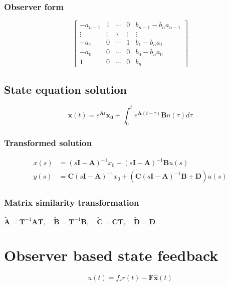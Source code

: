 \subsubsection*{Observer form}
\[
\left[\begin{array}{cccc|c}
-a_{n-1} & 1 & \cdots & 0 & b_{n-1}-b_{n}a_{n-1}\\
\vdots & \vdots & \ddots & \vdots & \vdots\\
-a_{1} & 0 & \cdots & 1 & b_{1}-b_{n}a_{1}\\
-a_{0} & 0 & \cdots & 0 & b_{0}-b_{n}a_{0}\\
\hline 1 & 0 & \cdots & 0 & b_{n}
\end{array}\right]
\]

\subsection*{State equation solution}
\[ \boldsymbol{x}(t) = e^{\boldsymbol{A}t}\boldsymbol{x_0} + \int_{0}^{t} e^{\boldsymbol{A}(t-\tau)}\boldsymbol{B}u(\tau)d\tau \]

\subsubsection*{Transformed solution}

\begin{align*}
x(s) & = (s\boldsymbol{I} - \boldsymbol{A})^{-1}x_0 + (s\boldsymbol{I} - \boldsymbol{A})^{-1}\boldsymbol{B}u(s)\\
y(s) & = \boldsymbol{C}(s\boldsymbol{I} - \boldsymbol{A})^{-1}x_0 + \left( \boldsymbol{C}(s\boldsymbol{I} - \boldsymbol{A})^{-1}\boldsymbol{B} + \boldsymbol{D} \right)u(s)
\end{align*}

\subsubsection*{Matrix similarity transformation}
\( \tilde{\boldsymbol{A}}=\boldsymbol{T}^{-1}\boldsymbol{A}\boldsymbol{T}, \quad
\tilde{\boldsymbol{B}}=\boldsymbol{T}^{-1}\boldsymbol{B}, \quad
\tilde{\boldsymbol{C}}=\boldsymbol{C}\boldsymbol{T}, \quad
\tilde{\boldsymbol{D}}=\boldsymbol{D} \)


\section*{Observer based state feedback}
\begin{center}
    
\end{center}
\[
u\left(t\right)=f_{r}r\left(t\right)-\boldsymbol{F}\hat{\boldsymbol{x}}\left(t\right)
\]

